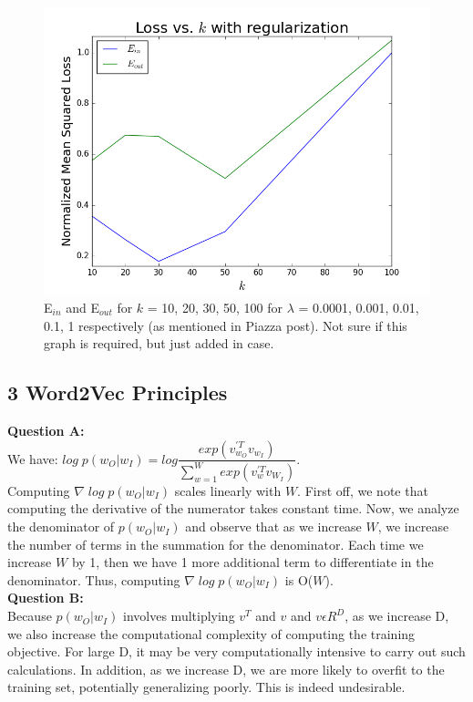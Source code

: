 \documentclass[12 pt]{article}
\begin{document}
	

	\begin{figure}[H]
	\centering
	\includegraphics[width=13cm]{2E_singleGraph}
	\caption{E$_{in}$ and E$_{out}$ for $k$ = 10, 20, 30, 50, 100 for  $\lambda$ = 0.0001, 0.001, 0.01, 0.1, 1 respectively (as mentioned in Piazza post). Not sure if this graph is required, but just added in case.}
	\end{figure}
	

	
	\subsection*{3 Word2Vec Principles}
	\noindent\textbf{Question A:} \\
	\noindent We have: $log \; p(w_O |w_I) = log \dfrac{exp(v_{w_O}^{'T}v_{w_I})}{\sum_{w = 1 }^{W} exp(v_w^{'T}v_{W_I})}$. \\ 
	
	\noindent Computing $\nabla \;log \; p(w_O |w_I)$ scales linearly with $W$. First off, we note that computing the derivative of the numerator takes constant time. Now, we analyze the denominator of $p(w_O | w_I)$ and observe that as we increase $W$, we increase the number of terms in the summation for the denominator. Each time we increase $W$ by 1, then we have 1 more additional term to differentiate in the denominator.  Thus, computing $\nabla \;log \; p(w_O |w_I)$ is O($W$). \\
	
	\noindent\textbf{Question B:} \\
	\noindent Because $p(w_O |w_I)$ involves multiplying $v^T$ and $v$ and $v \epsilon R^D$, as we increase D, we also increase the computational complexity of computing the training objective. For large D, it may be very computationally intensive to carry out such calculations. In addition, as we increase D, we are more likely to overfit to the training set, potentially generalizing poorly. This is indeed undesirable. \\
	
\end{document}
